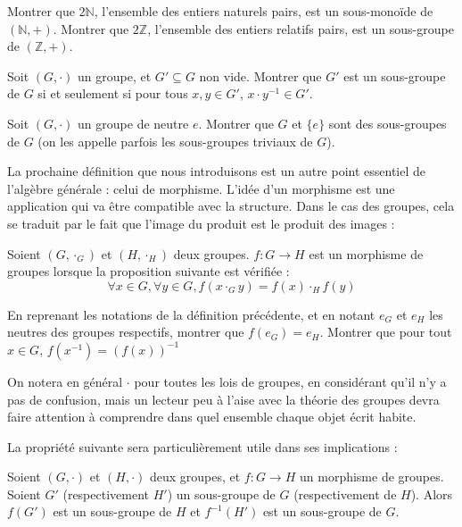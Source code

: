 \begin{exo}
    Montrer que $2\mathbb N$, l'ensemble des entiers naturels pairs, est un sous-monoïde de $(\mathbb N,+)$. Montrer que $2\mathbb Z$, l'ensemble des entiers relatifs pairs, est un sous-groupe de $(\mathbb Z,+)$.
\end{exo}

\begin{exo}
    Soit $(G,\cdot)$ un groupe, et $G'\subseteq G$ non vide. Montrer que $G'$ est un sous-groupe de $G$ si et seulement si pour tous $x,y\in G'$, $x\cdot y^{-1}\in G'$.
\end{exo}

\begin{exo}
    Soit $(G,\cdot)$ un groupe de neutre $e$. Montrer que $G$ et $\{e\}$ sont des sous-groupes de $G$ (on les appelle parfois les sous-groupes triviaux de $G$).
\end{exo}

La prochaine définition que nous introduisons est un autre point essentiel de l'algèbre générale : celui de morphisme. L'idée d'un morphisme est une application qui va être compatible avec la structure. Dans le cas des groupes, cela se traduit par le fait que l'image du produit est le produit des images :

\begin{defi}
    Soient $(G,\cdot_G)$ et $(H,\cdot_H)$ deux groupes. $f : G\to H$ est un morphisme de groupes lorsque la proposition suivante est vérifiée : $$\forall x\in G,\forall y \in G, f(x\cdot_G y)=f(x)\cdot_H f(y)$$
\end{defi}

\begin{exo}
    En reprenant les notations de la définition précédente, et en notant $e_G$ et $e_H$ les neutres des groupes respectifs, montrer que $f(e_G) = e_H$. Montrer que pour tout $x\in G$, $f(x^{-1}) = (f(x))^{-1}$
\end{exo}

On notera en général $\cdot$ pour toutes les lois de groupes, en considérant qu'il n'y a pas de confusion, mais un lecteur peu à l'aise avec la théorie des groupes devra faire attention à comprendre dans quel ensemble chaque objet écrit habite.

La propriété suivante sera particulièrement utile dans ses implications :

\begin{prop}
    Soient $(G,\cdot)$ et $(H,\cdot)$ deux groupes, et $f : G\to H$ un morphisme de groupes. Soient $G'$ (respectivement $H'$) un sous-groupe de $G$ (respectivement de $H$). Alors $f(G')$ est un sous-groupe de $H$ et $f^{-1}(H')$ est un sous-groupe de $G$.
\end{prop}

